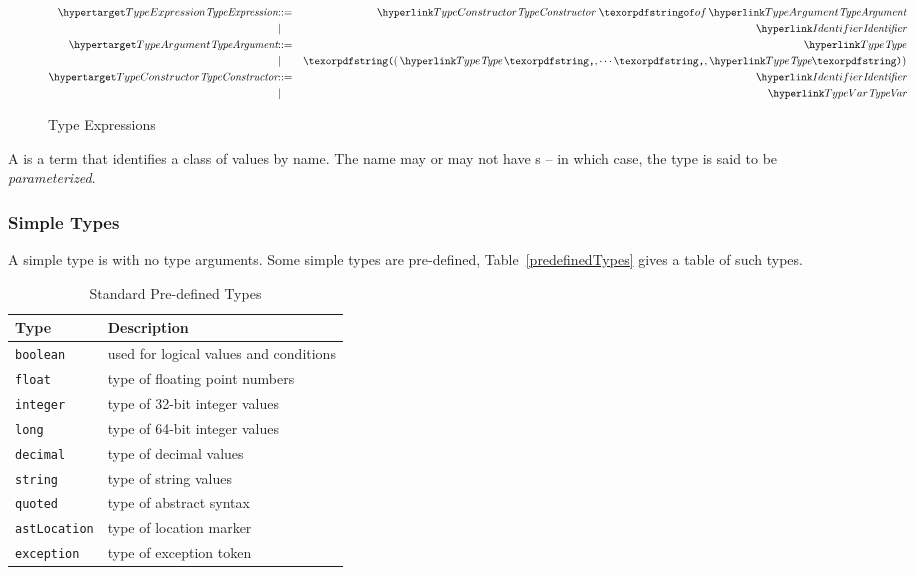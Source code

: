 \begin{figure}[htbp]
\begin{eqnarray*}
\ntDef{TypeExpression}&\arrow&\ntRef{TypeConstructor}\ \q{of}\,\ntRef{TypeArgument}\\
&\choice&\ntRef{Identifier}\\
\ntDef{TypeArgument}&\arrow&\ntRef{Type}\\
&\choice&\q{(}\,\ntRef{Type}\sequence{,}\ntRef{Type}\q{)}\\
\ntDef{TypeConstructor}&\arrow&\ntRef{Identifier}\\
&\choice&\ntRef{TypeVar}
\end{eqnarray*}
\caption{Type Expressions}
\label{typeExpressionFig}
\end{figure}

A  is a term that identifies a class of values by name. The name may or may not have s -- in which case, the type is said to be \emph{parameterized}.

\subsubsection{Simple Types}
\label{simpleType}
A simple type is  with no type arguments. Some simple types are pre-defined, Table~\vref{predefinedTypes} gives a table of such types.

\begin{table}[h]
\begin{center}
\caption{Standard Pre-defined Types\label{predefinedTypes}}
\begin{tabular}{|ll|}
\hline
Type&Description\\
\hline
\tt boolean&used for logical values and conditions\\
\tt float&type of floating point numbers\\
\tt integer&type of 32-bit integer values\\
\tt long&type of 64-bit integer values\\
\tt decimal&type of decimal values\\
\tt string&type of string values\\
\tt quoted&type of abstract syntax\\
\tt astLocation&type of location marker\\
\tt exception&type of exception token\\
\hline
\end{tabular}
\end{center}
\end{table}

